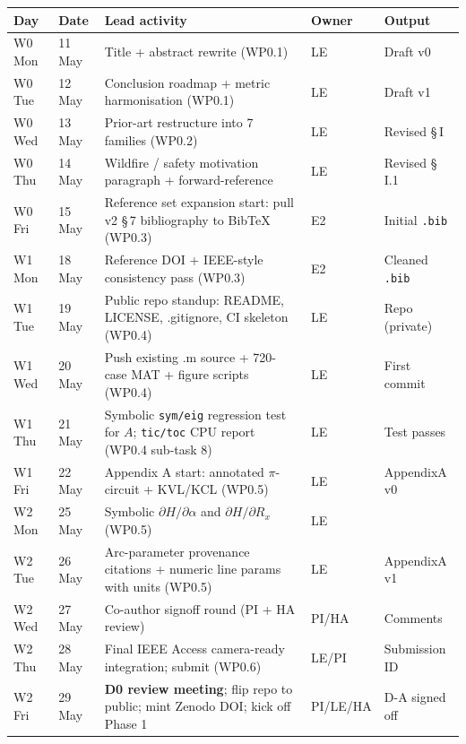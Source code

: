\documentclass[11pt,a4paper]{article}
\newcommand{\fpath}[1]{\texttt{\seqsplit{#1}}}
\begin{document}
\renewcommand{\arraystretch}{1.10}
\begin{longtable}{L{1.4cm}L{1.5cm}L{7.8cm}L{1.2cm}L{2.6cm}}
\toprule{}
\textbf{Day} & \textbf{Date} & \textbf{Lead activity} & \textbf{Owner} & \textbf{Output}\\\midrule\endhead
W0 Mon & 11 May & Title + abstract rewrite (WP0.1)                              & LE     & Draft v0\\
W0 Tue & 12 May & Conclusion roadmap + metric harmonisation (WP0.1)             & LE     & Draft v1\\
W0 Wed & 13 May & Prior-art restructure into 7 families (WP0.2)                 & LE     & Revised \S\,I\\
W0 Thu & 14 May & Wildfire / safety motivation paragraph + forward-reference   & LE     & Revised \S\,I.1\\
W0 Fri & 15 May & Reference set expansion start: pull v2 \S\,7 bibliography to BibTeX (WP0.3) & E2 & Initial \texttt{.bib}\\
W1 Mon & 18 May & Reference DOI + IEEE-style consistency pass (WP0.3)           & E2     & Cleaned \texttt{.bib}\\
W1 Tue & 19 May & Public repo standup: README, LICENSE, .gitignore, CI skeleton (WP0.4) & LE & Repo (private)\\
W1 Wed & 20 May & Push existing .m source + 720-case MAT + figure scripts (WP0.4) & LE   & First commit\\
W1 Thu & 21 May & Symbolic \texttt{sym/eig} regression test for $A$; \texttt{tic/toc} CPU report (WP0.4 sub-task 8) & LE & Test passes\\
W1 Fri & 22 May & Appendix A start: annotated $\pi$-circuit + KVL/KCL (WP0.5)   & LE     & AppendixA v0\\
W2 Mon & 25 May & Symbolic $\partial H/\partial\alpha$ and $\partial H/\partial R_x$ (WP0.5) & LE & \fpath{derive\_partials.m}\\
W2 Tue & 26 May & Arc-parameter provenance citations + numeric line params with units (WP0.5) & LE & AppendixA v1\\
W2 Wed & 27 May & Co-author signoff round (PI + HA review)                      & PI/HA  & Comments\\
W2 Thu & 28 May & Final IEEE Access camera-ready integration; submit (WP0.6)   & LE/PI  & Submission ID\\
W2 Fri & 29 May & \textbf{D0 review meeting}; flip repo to public; mint Zenodo DOI; kick off Phase 1 & PI/LE/HA & D-A signed off\\
\bottomrule
\end{longtable}
\end{document}
